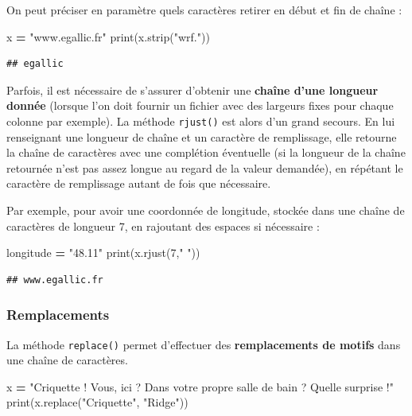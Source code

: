 \documentclass[
  12pt,
]{book}
\newenvironment{Shaded}{\begin{snugshade}}{\end{snugshade}}
\newcommand{\BuiltInTok}[1]{#1}
\newcommand{\DecValTok}[1]{\textcolor[rgb]{0.00,0.00,0.81}{#1}}
\newcommand{\NormalTok}[1]{#1}
\newcommand{\OperatorTok}[1]{\textcolor[rgb]{0.81,0.36,0.00}{\textbf{#1}}}
\newcommand{\StringTok}[1]{\textcolor[rgb]{0.31,0.60,0.02}{#1}}
\numberwithin{equation}{section}
\numberwithin{countremarque}{section}
\begin{document}
On peut préciser en paramètre quels caractères retirer en début et fin de chaîne :

\begin{Shaded}
\begin{Highlighting}[]
\NormalTok{x }\OperatorTok{=} \StringTok{"www.egallic.fr"}
\BuiltInTok{print}\NormalTok{(x.strip(}\StringTok{"wrf."}\NormalTok{))}
\end{Highlighting}
\end{Shaded}

\begin{lstlisting}
## egallic
\end{lstlisting}

Parfois, il est nécessaire de s'assurer d'obtenir une \textbf{chaîne d'une longueur donnée} (lorsque l'on doit fournir un fichier avec des largeurs fixes pour chaque colonne par exemple). La méthode \texttt{rjust()} est alors d'un grand secours. En lui renseignant une longueur de chaîne et un caractère de remplissage, elle retourne la chaîne de caractères avec une complétion éventuelle (si la longueur de la chaîne retournée n'est pas assez longue au regard de la valeur demandée), en répétant le caractère de remplissage autant de fois que nécessaire.

Par exemple, pour avoir une coordonnée de longitude, stockée dans une chaîne de caractères de longueur 7, en rajoutant des espaces si nécessaire :

\begin{Shaded}
\begin{Highlighting}[]
\NormalTok{longitude }\OperatorTok{=} \StringTok{"48.11"}
\BuiltInTok{print}\NormalTok{(x.rjust(}\DecValTok{7}\NormalTok{,}\StringTok{" "}\NormalTok{))}
\end{Highlighting}
\end{Shaded}

\begin{lstlisting}
## www.egallic.fr
\end{lstlisting}

\subsubsection{Remplacements}\label{remplacements}

La méthode \texttt{replace()} permet d'effectuer des \textbf{remplacements de motifs} dans une chaîne de caractères.

\begin{Shaded}
\begin{Highlighting}[]
\NormalTok{x }\OperatorTok{=} \StringTok{"Criquette ! Vous, ici ? Dans votre propre salle de bain ? Quelle surprise !"}
\BuiltInTok{print}\NormalTok{(x.replace(}\StringTok{"Criquette"}\NormalTok{, }\StringTok{"Ridge"}\NormalTok{))}
\end{Highlighting}
\end{Shaded}
\end{document}
